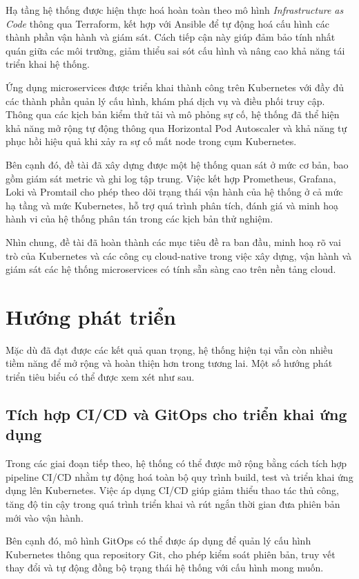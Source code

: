 Hạ tầng hệ thống được hiện thực hoá hoàn toàn theo mô hình \textit{Infrastructure
as Code} thông qua Terraform, kết hợp với Ansible để tự động hoá cấu hình các thành
phần vận hành và giám sát. Cách tiếp cận này giúp đảm bảo tính nhất quán giữa các
môi trường, giảm thiểu sai sót cấu hình và nâng cao khả năng tái triển khai hệ thống.

Ứng dụng microservices được triển khai thành công trên Kubernetes với đầy đủ các
thành phần quản lý cấu hình, khám phá dịch vụ và điều phối truy cập. Thông qua các
kịch bản kiểm thử tải và mô phỏng sự cố, hệ thống đã thể hiện khả năng mở rộng tự
động thông qua Horizontal Pod Autoscaler và khả năng tự phục hồi hiệu quả khi xảy
ra sự cố mất node trong cụm Kubernetes.

Bên cạnh đó, đề tài đã xây dựng được một hệ thống quan sát ở mức cơ bản, bao gồm
giám sát metric và ghi log tập trung. Việc kết hợp Prometheus, Grafana, Loki và
Promtail cho phép theo dõi trạng thái vận hành của hệ thống ở cả mức hạ tầng và
mức Kubernetes, hỗ trợ quá trình phân tích, đánh giá và minh hoạ hành vi của hệ
thống phân tán trong các kịch bản thử nghiệm.

Nhìn chung, đề tài đã hoàn thành các mục tiêu đề ra ban đầu, minh hoạ rõ vai trò
của Kubernetes và các công cụ cloud-native trong việc xây dựng, vận hành và giám
sát các hệ thống microservices có tính sẵn sàng cao trên nền tảng cloud.

\section{Hướng phát triển}
\label{sec:chap4-future-work}

Mặc dù đã đạt được các kết quả quan trọng, hệ thống hiện tại vẫn còn nhiều tiềm
năng để mở rộng và hoàn thiện hơn trong tương lai. Một số hướng phát triển tiêu
biểu có thể được xem xét như sau.

\subsection{Tích hợp CI/CD và GitOps cho triển khai ứng dụng}

Trong các giai đoạn tiếp theo, hệ thống có thể được mở rộng bằng cách tích hợp
pipeline CI/CD nhằm tự động hoá toàn bộ quy trình build, test và triển khai ứng
dụng lên Kubernetes. Việc áp dụng CI/CD giúp giảm thiểu thao tác thủ công, tăng độ
tin cậy trong quá trình triển khai và rút ngắn thời gian đưa phiên bản mới vào
vận hành.

Bên cạnh đó, mô hình GitOps có thể được áp dụng để quản lý cấu hình Kubernetes
thông qua repository Git, cho phép kiểm soát phiên bản, truy vết thay đổi và tự
động đồng bộ trạng thái hệ thống với cấu hình mong muốn.

